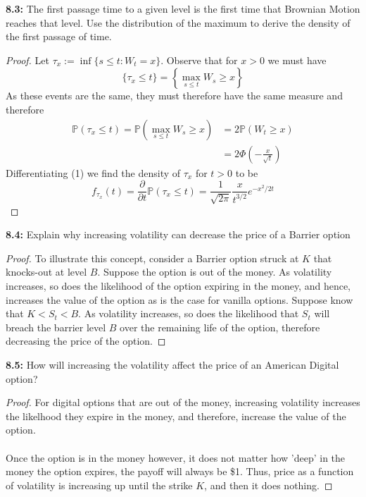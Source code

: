 \documentclass{article}
\begin{document}
\begin{tcolorbox}[colframe=black,colback=gray!5,boxrule=0.5pt]
\textbf{8.3:} The first passage time to a given level is the first time that Brownian Motion reaches that level. Use the distribution of the maximum to derive the density of the first passage of time. 
\end{tcolorbox}
\begin{proof}
    Let $\tau_x := \inf \{s\leq t: W_t = x\}$. Observe that for $x > 0$ we must have 
    $$\{\tau_x\leq t\} = \left\{\max_{s\leq t}W_s\geq x\right\}$$
    As these events are the same, they must therefore have the same measure and therefore
    \begin{align*}
        \mathbb{P}(\tau_x\leq t) = \mathbb{P}(\max_{s\le t} W_s\geq x) &= 2\mathbb{P}(W_t\geq x) \tag{Reflection Principal} \\
        &= 2\Phi\left(-\frac{x}{\sqrt{t}}\right) \tag{1}
    \end{align*}
    Differentiating (1) we find the density of $\tau_x$ for $t>0$ to be
    $$f_{\tau_x}(t) = \frac{\partial}{\partial t} \mathbb{P}(\tau_x\leq t) = \frac{1}{\sqrt{2\pi}}\frac{x}{t^{3/2}}e^{-x^2/2t}$$
\end{proof}




\begin{tcolorbox}[colframe=black,colback=gray!5,boxrule=0.5pt]
\textbf{8.4:} Explain why increasing volatility can decrease the price of a Barrier option
\end{tcolorbox}
\begin{proof}
    To illustrate this concept, consider a Barrier option struck at $K$ that knocks-out at level $B$. Suppose the option is out of the money. As volatility increases, so does the likelihood of the option expiring in the money, and hence, increases the value of the option as is the case for vanilla options. Suppose know that $K < S_t < B$. As volatility increases, so does the likelihood that $S_t$ will breach the barrier level $B$ over the remaining life of the option, therefore decreasing the price of the option.
\end{proof}

\begin{tcolorbox}[colframe=black,colback=gray!5,boxrule=0.5pt]
\textbf{8.5:} How will increasing the volatility affect the price of an American Digital option?
\end{tcolorbox}
\begin{proof}
    For digital options that are out of the money, increasing volatility increases the likelhood they expire in the money, and therefore, increase the value of the option. \\
    \\
    Once the option is in the money however, it does not matter how 'deep' in the money the option expires, the payoff will always be \$1. Thus, price as a function of volatility is increasing up until the strike $K$, and then it does nothing.
\end{proof}
\end{document}
